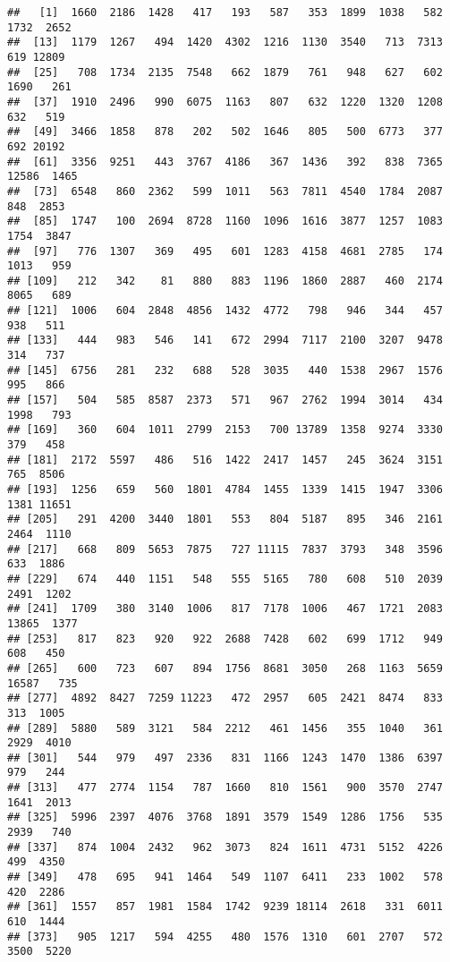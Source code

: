 \documentclass[
]{article}
\begin{document}
\begin{verbatim}
##   [1]  1660  2186  1428   417   193   587   353  1899  1038   582  1732  2652
##  [13]  1179  1267   494  1420  4302  1216  1130  3540   713  7313   619 12809
##  [25]   708  1734  2135  7548   662  1879   761   948   627   602  1690   261
##  [37]  1910  2496   990  6075  1163   807   632  1220  1320  1208   632   519
##  [49]  3466  1858   878   202   502  1646   805   500  6773   377   692 20192
##  [61]  3356  9251   443  3767  4186   367  1436   392   838  7365 12586  1465
##  [73]  6548   860  2362   599  1011   563  7811  4540  1784  2087   848  2853
##  [85]  1747   100  2694  8728  1160  1096  1616  3877  1257  1083  1754  3847
##  [97]   776  1307   369   495   601  1283  4158  4681  2785   174  1013   959
## [109]   212   342    81   880   883  1196  1860  2887   460  2174  8065   689
## [121]  1006   604  2848  4856  1432  4772   798   946   344   457   938   511
## [133]   444   983   546   141   672  2994  7117  2100  3207  9478   314   737
## [145]  6756   281   232   688   528  3035   440  1538  2967  1576   995   866
## [157]   504   585  8587  2373   571   967  2762  1994  3014   434  1998   793
## [169]   360   604  1011  2799  2153   700 13789  1358  9274  3330   379   458
## [181]  2172  5597   486   516  1422  2417  1457   245  3624  3151   765  8506
## [193]  1256   659   560  1801  4784  1455  1339  1415  1947  3306  1381 11651
## [205]   291  4200  3440  1801   553   804  5187   895   346  2161  2464  1110
## [217]   668   809  5653  7875   727 11115  7837  3793   348  3596   633  1886
## [229]   674   440  1151   548   555  5165   780   608   510  2039  2491  1202
## [241]  1709   380  3140  1006   817  7178  1006   467  1721  2083 13865  1377
## [253]   817   823   920   922  2688  7428   602   699  1712   949   608   450
## [265]   600   723   607   894  1756  8681  3050   268  1163  5659 16587   735
## [277]  4892  8427  7259 11223   472  2957   605  2421  8474   833   313  1005
## [289]  5880   589  3121   584  2212   461  1456   355  1040   361  2929  4010
## [301]   544   979   497  2336   831  1166  1243  1470  1386  6397   979   244
## [313]   477  2774  1154   787  1660   810  1561   900  3570  2747  1641  2013
## [325]  5996  2397  4076  3768  1891  3579  1549  1286  1756   535  2939   740
## [337]   874  1004  2432   962  3073   824  1611  4731  5152  4226   499  4350
## [349]   478   695   941  1464   549  1107  6411   233  1002   578   420  2286
## [361]  1557   857  1981  1584  1742  9239 18114  2618   331  6011   610  1444
## [373]   905  1217   594  4255   480  1576  1310   601  2707   572  3500  5220

\end{verbatim}
\end{document}
